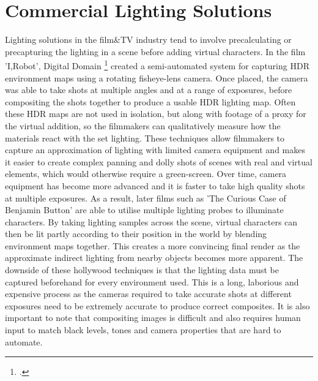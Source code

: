 \documentclass[ %
                    author={Gavin Parker},
                supervisor={Dr. Neill Campbell},
                    degree={MEng},
                     title={Deep Siamese Networks for Illumination Estimation from Stereo Images},
                  subtitle={},
                      type={research},
                      year={2018} ]{dissertation}
\begin{document}
\section{Commercial Lighting Solutions}
Lighting solutions in the film\&TV industry tend to involve precalculating or precapturing the lighting in a scene before adding virtual characters. In the film 'I,Robot', Digital Domain \footcite{https://www.digitaldomain.com/work/i-robot/}  created a semi-automated system for capturing HDR environment maps using a rotating fisheye-lens camera. Once placed, the camera was able to take shots at multiple angles and at a range of exposures, before compositing the shots together to produce a usable HDR lighting map. Often these HDR maps are not used in isolation, but along with footage of a proxy for the virtual addition, so the filmmakers can qualitatively measure how the materials react with the set lighting. These techniques allow filmmakers to capture an approximation of lighting with limited camera equipment and makes it easier to create complex panning and dolly shots of scenes with real and virtual elements, which would otherwise require a green-screen. Over time, camera equipment has become more advanced and it is faster to take high quality shots at multiple exposures. As a result, later films such as 'The Curious Case of Benjamin Button' are able to utilise multiple lighting probes to illuminate characters. By taking lighting samples across the scene, virtual characters can then be lit partly according to their position in the world by blending environment maps together. This creates a more convincing final render as the approximate indirect lighting from nearby objects becomes more apparent. The downside of these hollywood techniques is that the lighting data must be captured beforehand for every environment used. This is a long, laborious and expensive process as the cameras required to take accurate shots at different exposures need to be extremely accurate to produce correct composites. It is also important to note that compositing images is difficult and also requires human input to match black levels, tones and camera properties that are hard to automate.
\newline
\end{document}
